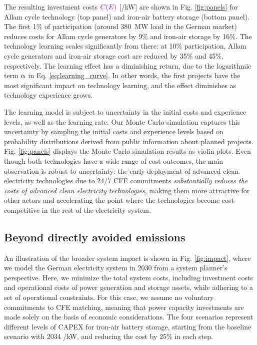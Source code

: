 \documentclass[pdflatex,sn-basic, Numbered]{sn-jnl}%
\theoremstyle{thmstyleone}%
\theoremstyle{thmstyletwo}%
\theoremstyle{thmstylethree}%
\begin{document}
The resulting investment costs $\color{violet}C(E)\color{black}$ [\officialeuro/kW] are shown in Fig. \ref{fig:panels} for Allam cycle technology (top panel) and iron-air battery storage (bottom panel).
The first 1\% of participation (around 380~MW load in the German market) reduces costs for Allam cycle generators by 9\% and iron-air storage by 16\%. The technology learning scales significantly from there: at 10\% participation, Allam cycle generators and iron-air storage cost are reduced by 35\% and 45\%, respectively. The learning effect has a diminishing return, due to the logarithmic term $\color{black}\alpha$ in Eq. \ref{eq:learning_curve}. In other words, the first projects have the most significant impact on technology learning, and the effect diminishes as technology experience grows.

The learning model is subject to uncertainty in the initial costs and experience levels, as well as the learning rate. Our Monte Carlo simulation captures this uncertainty by sampling the initial costs and experience levels based on probability distributions derived from public information about planned projects. Fig. \ref{fig:panels} displays the Monte Carlo simulation results as violin plots. Even though both technologies have a wide range of cost outcomes, the main observation is robust to uncertainty: the early deployment of advanced clean electricity technologies due to 24/7 CFE commitments \textit{substantially reduces the costs of advanced clean electricity technologies}, making them more attractive for other actors and accelerating the point where the technologies become cost-competitive in the rest of the electricity system.

\subsection*{Beyond directly avoided emissions}\label{sec4}

An illustration of the broader system impact is shown in Fig. \ref{fig:impact}, where we model the German electricity system in 2030 from a system planner's perspective. Here, we minimize the total system costs, including investment costs and operational costs of power generation and storage assets, while adhering to a set of operational constraints. For this case, we assume no voluntary commitments to CFE matching, meaning that power capacity investments are made solely on the basis of economic considerations. The four scenarios represent different levels of CAPEX for iron-air battery storage, starting from the baseline scenario with 2034 \officialeuro/kW, and reducing the cost by 25\% in each step.
\end{document}

